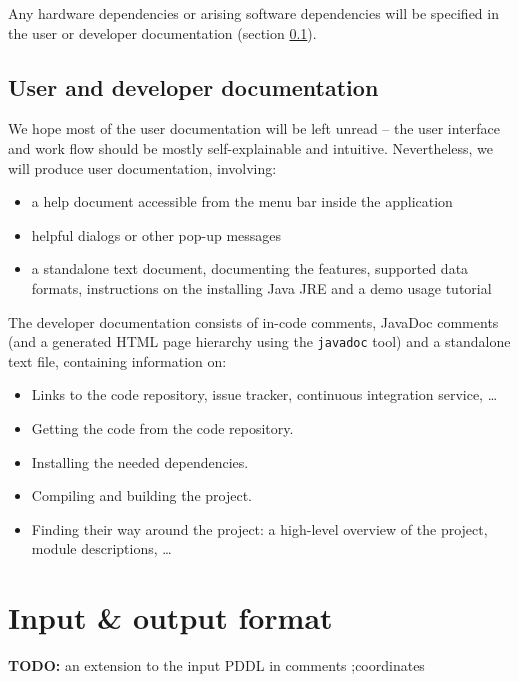 \documentclass[10pt,a4paper,oneside]{article}
\newcommand{\TODO}[1]{{\textbf{TODO:} #1}} %
\begin{document}
Any hardware dependencies or arising software dependencies will be specified in the user or developer documentation (section \ref{docs}).

\subsection{User and developer documentation} \label{docs}

We hope most of the user documentation will be left unread -- the user interface and work flow should be
mostly self-explainable and intuitive.
Nevertheless, we will produce user documentation, involving:
\begin{itemize}
\item a help document accessible from the menu bar inside the application
\item helpful dialogs or other pop-up messages
\item a standalone text document, documenting the features, supported data formats, instructions on the installing Java JRE and a demo usage tutorial
\end{itemize}

The developer documentation consists of in-code comments, JavaDoc comments (and a generated HTML page hierarchy using the \verb+javadoc+ tool) and a standalone text file, containing information on:
\begin{itemize}
\item Links to the code repository, issue tracker, continuous integration service, \ldots
\item Getting the code from the code repository.
\item Installing the needed dependencies.
\item Compiling and building the project.
\item Finding their way around the project: a high-level overview of the project, module descriptions, \ldots
\end{itemize}






\section{Input \& output format} \label{inputoutput}


\TODO an extension to the input PDDL in comments ;coordinates
\end{document}
